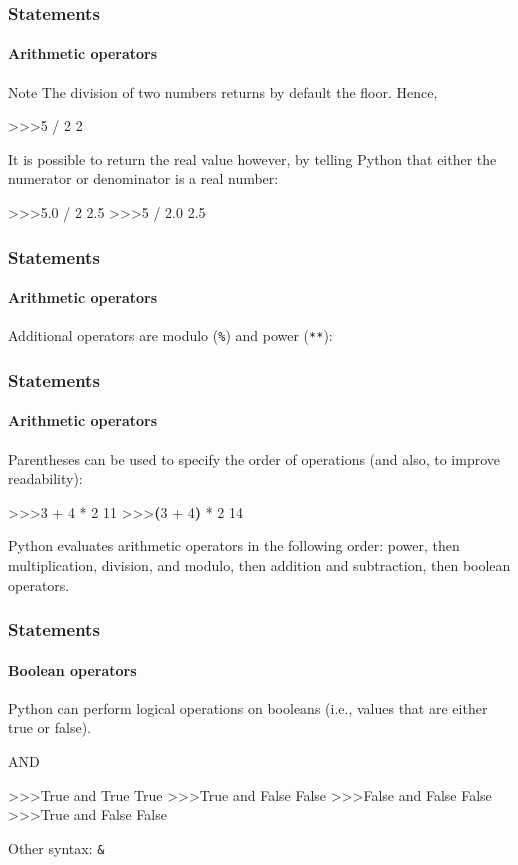 \documentclass[handout]{beamer}
\def\prompt{>\hspace{-1pt}>\hspace{-1pt}>\/}
\begin{document}
\begin{frame}[fragile]
	\frametitle{Statements}
	\framesubtitle{Arithmetic operators}

	\begin{block}{Note}
		The division of two numbers returns by default the floor. Hence,
		\begin{semiverbatim}
			\prompt 5 / 2
			2
		\end{semiverbatim}

		\medskip
		It is possible to return the real value however, by telling Python that either the numerator or denominator is a real number:
		\begin{semiverbatim}
			\prompt 5.0 / 2
			2.5
			\prompt 5 / 2.0
			2.5
		\end{semiverbatim}
	\end{block}
\end{frame}

\begin{frame}[fragile]
	\frametitle{Statements}
	\framesubtitle{Arithmetic operators}

	Additional operators are modulo (\texttt{\%}) and power (\texttt{**}):

\end{frame}

\begin{frame}[fragile]
	\frametitle{Statements}
	\framesubtitle{Arithmetic operators}
	Parentheses can be used to specify the order of operations (and also, to improve readability):

	\begin{semiverbatim}
		\prompt 3 + 4 * 2
		11
		\prompt \textbf{(}3 + 4\textbf{)} * 2
		14
	\end{semiverbatim}

	Python evaluates arithmetic operators in the following order: power, then multiplication, division, and modulo, then addition and subtraction, then boolean operators.
\end{frame}

\begin{frame}[fragile]
	\frametitle{Statements}
	\framesubtitle{Boolean operators}

	Python can perform logical operations on booleans (i.e., values that are either true or false).

	\begin{block}{AND}
		\begin{semiverbatim}
			\prompt True and True
			True
			\prompt True and False
			False
			\prompt False and False
			False
			\prompt True and False
			False
		\end{semiverbatim}

		Other syntax: \texttt{\&}
	\end{block}
\end{frame}
\end{document}
